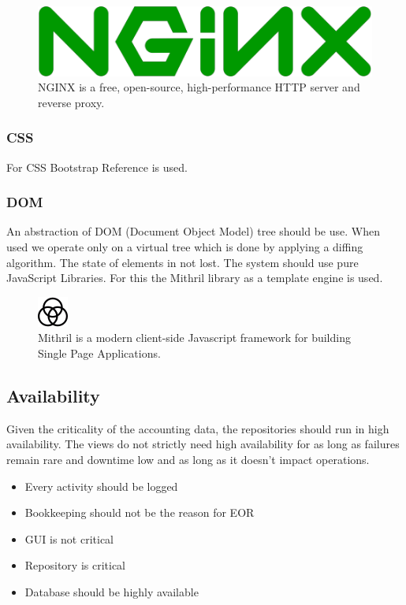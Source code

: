 \begin{figure}[h]
  \begin{center}
    \includegraphics[scale=0.3]{./images/nginx.png}
    \caption{NGINX is a free, open-source, high-performance HTTP server and reverse proxy.}
    \label{fig:}
  \end{center}
\end{figure}

\subsubsection{CSS}
For CSS Bootstrap Reference is used.

\subsubsection{DOM}
An abstraction of DOM (Document Object Model) tree should be use. When used we operate only on a virtual tree which is done by applying a diffing algorithm. The state of elements in not lost. The system should use pure JavaScript Libraries. For this the Mithril library as a template engine is used.

\begin{figure}[h]
  \begin{center}
    \includegraphics[scale=1]{./images/mithril.png}
    \caption{Mithril is a modern client-side Javascript framework for building Single Page Applications.}
    \label{fig:}
  \end{center}
\end{figure}

\subsection{Availability}
Given the criticality of the accounting data, the repositories should run in high availability. The views do not strictly need high availability for as long as failures remain rare and downtime low and as long as it doesn’t impact operations.

\begin{itemize}
  \item Every activity should be logged
  \item Bookkeeping should not be the reason for EOR
  \item GUI is not critical
  \item Repository is critical
  \item Database should be highly available
\end{itemize}

